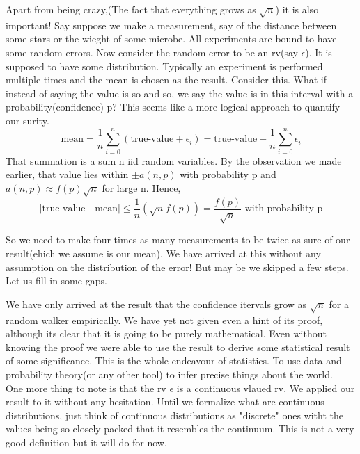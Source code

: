 \documentclass{myclass}
\begin{document}
Apart from being crazy,(The fact that everything grows as $\sqrt{n}$) it is also important! Say suppose we make a measurement, say of the distance between some stars or the wieght of some microbe. All experiments are bound to have some random errors.
Now consider the random error to be an rv(say $\epsilon$). It is supposed to have some distribution. Typically an experiment is performed multiple times and the mean is chosen as the result. Consider this. What if instead of
saying the value is so and so, we say the value is in this interval with a probability(confidence) p? This seems like a more logical approach to quantify our surity.
$$\text{mean}=\frac{1}{n}\sum_{i=0}^{n}(\text{true-value}+\epsilon_i)=\text{true-value}+\frac{1}{n}\sum_{i=0}^n\epsilon_i$$
That summation is a sum n iid random variables. By the observation we made earlier, that value lies within $\pm a(n,p)$ with probability p and $a(n,p)\approx f(p)\sqrt{n}$ for large n. Hence,
$$|\text{true-value - mean}|\leq \frac{1}{n}(\sqrt{n}f(p))=\frac{f(p)}{\sqrt{n}} \text{ with probability p}$$

So we need to make four times as many measurements to be twice as sure of our result(ehich we assume is our mean). We have arrived at this without any assumption on the distribution of the error!
But may be we skipped a few steps. Let us fill in some gaps.
\begin{remarks}
    We have only arrived at the result that the confidence itervals grow as $\sqrt{n}$ for a random walker empirically. We have yet not given even a hint of its proof, although its clear that it is going to be purely mathematical.
    Even without knowing the proof we were able to use the result to derive some statistical result of some significance. This is the whole endeavour of statistics. To use data and probability theory(or any other tool) to infer precise things about the world.
    \\
    One more thing to note is that the rv $\epsilon$ is a continuous vlaued rv. We applied our result to it without any hesitation. Until we formalize what are continuous distributions, just think of continuous distributions as "discrete" ones
    witht the values being so closely packed that it resembles the continuum. This is not a very good definition but it will do for now.
\end{remarks}
\end{document}
